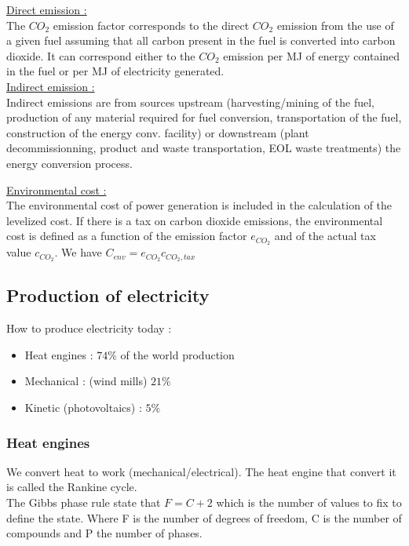 \documentclass[../main.tex]{subfiles}
\begin{document}
\quad \underline{Direct emission :}\\
The $CO_2$ emission factor corresponds to the direct $CO_2$ emission from the use of a given fuel assuming that all carbon present in the fuel is converted into carbon dioxide. It can correspond either to the $CO_2$ emission per MJ of energy contained in the fuel or per MJ of electricity generated.\\

\quad \underline{Indirect emission :}\\
Indirect emissions are from sources upstream (harvesting/mining of the fuel, production of any material required for fuel conversion, transportation of the fuel, construction of the energy conv. facility) or downstream (plant decommissionning, product and waste transportation, EOL waste treatments) the energy conversion process. 

\quad \underline{Environmental cost :}\\
The environmental cost of power generation is included in the calculation of the levelized cost. If there is a tax on carbon dioxide emissions, the environmental cost is defined as a function of the emission factor $e_{CO_2}$ and of the actual tax value $c_{CO_2}$. We have $C_{env} = e_{CO_2} c_{CO_2, tax}$

\subsection{Production of electricity}
How to produce electricity today : \begin{itemize}
    \item Heat engines : $74\%$ of the world production
    \item Mechanical : (wind mills) $21\%$
    \item Kinetic (photovoltaics) : $5\%$
\end{itemize}

\subsubsection{Heat engines}
We convert heat to work (mechanical/electrical). The heat engine that convert it is called the Rankine cycle.\\

The Gibbs phase rule state that $F = C+2$ which is the number of values to fix to define the state. Where F is the number of degrees of freedom, C is the number of compounds and P the number of phases.\\
\end{document}
